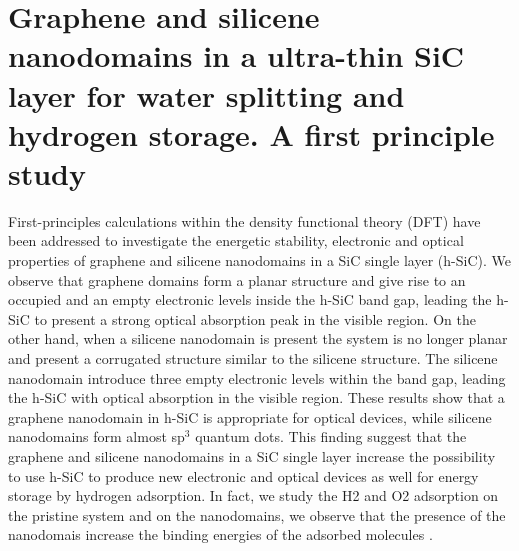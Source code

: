 \chapter{Graphene and silicene nanodomains in a ultra-thin SiC layer for water splitting and hydrogen storage. A first principle study}

First-principles calculations within the density functional theory (DFT) have been addressed to investigate the energetic stability, electronic and optical properties of graphene and silicene nanodomains in a SiC single layer (h-SiC). We observe that graphene domains form a planar structure and give rise to an occupied and an empty electronic levels inside the h-SiC band gap, leading the h-SiC to present a strong optical absorption peak in the visible region. On the other hand, when a silicene nanodomain is present the system is no longer planar and present a corrugated structure similar to the silicene structure. The silicene nanodomain introduce three empty electronic levels within the band gap, leading the h-SiC with optical absorption in the visible region. These results show that a graphene nanodomain in h-SiC is appropriate for optical devices, while silicene nanodomains form almost sp$^3$ quantum dots. This finding suggest that the graphene and silicene nanodomains in a SiC single layer increase the possibility to use h-SiC to produce new electronic and optical devices as well for energy storage by hydrogen adsorption. In fact, we study the H2 and O2 adsorption on the pristine system and on the nanodomains, we observe that the presence of the nanodomais increase the binding energies of the adsorbed molecules \cite{kremer2020graphene}.